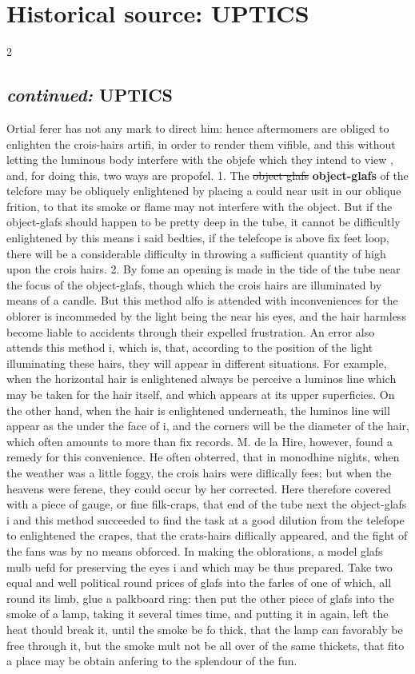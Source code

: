 \documentclass[10pt]{article}
\begin{document}
\section*{Historical source: UPTICS}
\begin{multicols}{2}
\subsection*{\textit{continued:} UPTICS}
Ortial ferer has not any mark to direct him: hence aftermomers are obliged to enlighten the crois-hairs artifi, in order to render them vifible, and this without letting the luminous body interfere with the objefe which they intend to view , and, for doing this, two ways are propofel. 1. The \sout{object glafs} \textbf{object-glafs} of the telcfore may be obliquely enlightened by placing a could near usit in our oblique frition, to that its smoke or flame may not interfere with the object. But if the object-glafs should happen to be pretty deep in the tube, it cannot be difficultly enlightened by this means i said bedties, if the telefcope is above fix feet loop, there will be a considerable difficulty in throwing a sufficient quantity of high upon the crois hairs. 2. By fome an opening is made in the tide of the tube near the focus of the object-glafs, though which the crois hairs are illuminated by means of a candle. But this method alfo is attended with inconveniences for the oblorer is incommeded by the light being the near his eyes, and the hair harmless become liable to accidents through their expelled frustration. An error also attends this method i, which is, that, according to the position of the light illuminating these hairs, they will appear in different situations. For example, when the horizontal hair is enlightened always be perceive a luminos line which may be taken for the hair itself, and which appears at its upper superficies. On the other hand, when the hair is enlightened underneath, the luminos line will appear as the under the face of i, and the corners will be the diameter of the hair, which often amounts to more than fix records. M. de la Hire, however, found a remedy for this convenience. He often obterred, that in monodhine nights, when the weather was a little foggy, the crois hairs were diflically fees; but when the heavens were ferene, they could occur by her corrected. Here therefore covered with a piece of gauge, or fine filk-craps, that end of the tube next the object-glafs i and this method succeeded to find the task at a good dilution from the telefope to enlightened the crapes, that the crats-hairs diflically appeared, and the fight of the fans was by no means obforced. In making the oblorations, a model glafs mulb uefd for preserving the eyes i and which may be thus prepared. Take two equal and well political round prices of glafs into the farles of one of which, all round its limb, glue a palkboard ring: then put the other piece of glafs into the smoke of a lamp, taking it several times time, and putting it in again, left the heat thould break it, until the smoke be fo thick, that the lamp can favorably be free through it, but the smoke mult not be all over of the same thickets, that fito a place may be obtain anfering to the splendour of the fun. 
\end{multicols}
\end{document}
